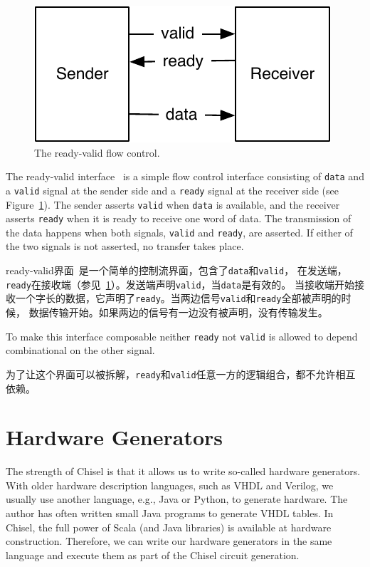 \documentclass[%
    10pt,
    headinclude, footexclude,
    openright, %
    notitlepage,
    cleardoubleempty,
    headsepline,
    pointlessnumbers,
    bibtotoc, idxtotoc,
    ]{scrbook}
\newcommand{\code}[1]{{\small{\texttt{#1}}}}
\newcommand{\scale}{0.7}
\newcommand{\todo}[1]{{\emph{TODO: #1}}}
\renewcommand{\todo}[1]{}
\begin{document}
\begin{figure}
  \centering
  \includegraphics[scale=\scale]{figures/readyvalid}
  \caption{The ready-valid flow control.}
  \label{fig:readyvalid}
\end{figure}

The ready-valid interface~\cite[p.~480]{dally:vhdl:2016} is a simple flow
control interface consisting of \code{data} and a \code{valid} signal at the
sender side and a \code{ready} signal at the receiver side (see
Figure~\ref{fig:readyvalid}). The sender asserts \code{valid} when \code{data} is available,
and the receiver asserts \code{ready} when it is ready to receive one word
of data. The transmission of the data happens when both signals, \code{valid}
and \code{ready}, are asserted. If either of the two signals is not asserted,
no transfer takes place.

ready-valid界面~\cite[p.~480]{dally:vhdl:2016}是一个简单的控制流界面，包含了\code{data}和\code{valid}，
在发送端，\code{ready}在接收端（参见~\ref{fig:readyvalid}）。发送端声明\code{valid}，当\code{data}是有效的。
当接收端开始接收一个字长的数据，它声明了\code{ready}。当两边信号\code{valid}和\code{ready}全部被声明的时候，
数据传输开始。如果两边的信号有一边没有被声明，没有传输发生。

To make this interface composable neither \code{ready} not \code{valid} is
allowed to depend combinational on the other signal.

为了让这个界面可以被拆解，\code{ready}和\code{valid}任意一方的逻辑组合，都不允许相互依赖。

\todo{Read and cite AXI}

\chapter{Hardware Generators}

The strength of Chisel is that it allows us to write so-called hardware generators.
With older hardware description languages, such as VHDL and Verilog,
we usually use another language, e.g., Java or Python, to generate hardware.
The author has often written small Java programs to generate VHDL tables.
In Chisel, the full power of Scala (and Java libraries) is available at hardware
construction. Therefore, we can write our hardware generators in the same
language and execute them as part of the Chisel circuit generation.
\end{document}
